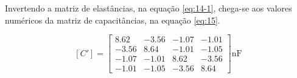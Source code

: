 \documentclass{aleph-revista}
\begin{document}
Invertendo a matriz de elastâncias, na equação \eqref{eq:14-1}, chega-se aos valores numéricos da matriz de capacitâncias, na equação \eqref{eq:15}.

\begin{equation}\label{eq:15}
  [C'] =
  \begin{bmatrix}
    8.62  & -3.56 & -1.07 & -1.01 \\
    -3.56 & 8.64  & -1.01 & -1.05 \\
    -1.07 & -1.01 & 8.62  & -3.56 \\
    -1.01 & -1.05 & -3.56 & 8.64
  \end{bmatrix}
  \textrm{nF}
\end{equation}

\bigskip
\medskip
\end{document}
